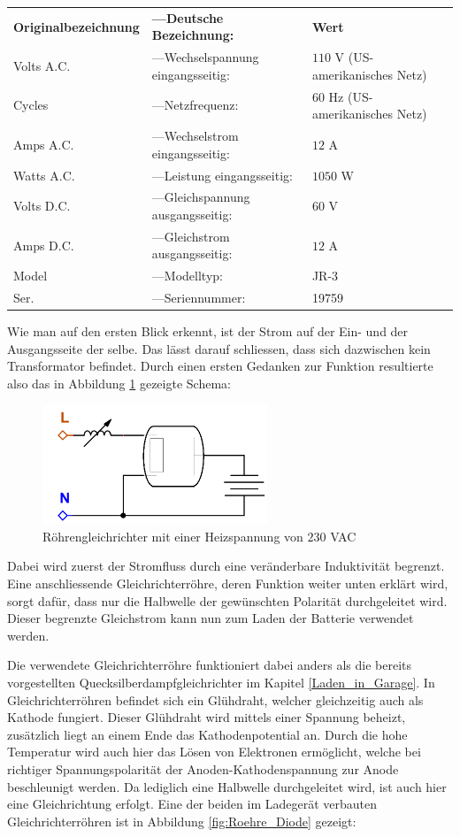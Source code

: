 \begin{tabular}{lll}
	\textbf{Originalbezeichnung} & \textbf{---\quad Deutsche Bezeichnung:} & \textbf{Wert} \\
	Volts A.C. & ---\quad Wechselspannung eingangsseitig: & $110$ V (US-amerikanisches Netz) \\
	Cycles & ---\quad Netzfrequenz: & $60$ Hz (US-amerikanisches Netz)\\
	Amps A.C. & ---\quad Wechselstrom eingangsseitig: & $12$ A \\
	Watts A.C. & ---\quad Leistung eingangsseitig: & $1050$ W \\
	Volts D.C. & ---\quad Gleichspannung ausgangsseitig: & $60$ V \\
	Amps D.C. & ---\quad Gleichstrom ausgangsseitig: & $12$ A \\
	Model & ---\quad Modelltyp: & JR-3 \\
	Ser. & ---\quad Seriennummer: & 19759
\end{tabular}

Wie man auf den ersten Blick erkennt, ist der Strom auf der Ein- und der Ausgangsseite der selbe. Das lässt darauf schliessen, dass sich dazwischen kein Transformator befindet. Durch einen ersten Gedanken zur Funktion resultierte also das in Abbildung \ref{fig:Ladegeraet1} gezeigte Schema:

\begin{figure}[h]
	\centering
		\includegraphics[width=0.60\textwidth]{images/Ladegeraet_Alt_1.PNG}
	\caption{Röhrengleichrichter mit einer Heizspannung von $230$ VAC}
	\label{fig:Ladegeraet1}
\end{figure}

Dabei wird zuerst der Stromfluss durch eine veränderbare Induktivität begrenzt. Eine anschliessende Gleichrichterröhre, deren Funktion weiter unten erklärt wird, sorgt dafür, dass nur die Halbwelle der gewünschten Polarität durchgeleitet wird. Dieser begrenzte Gleichstrom kann nun zum Laden der Batterie verwendet werden.

Die verwendete Gleichrichterröhre funktioniert dabei anders als die bereits vorgestellten Quecksilberdampfgleichrichter im Kapitel \ref{Laden_in_Garage}. In Gleichrichterröhren befindet sich ein Glühdraht, welcher gleichzeitig auch als Kathode fungiert. Dieser Glühdraht wird mittels einer Spannung beheizt, zusätzlich liegt an einem Ende das Kathodenpotential an. Durch die hohe Temperatur wird auch hier das Lösen von Elektronen ermöglicht, welche bei richtiger Spannungspolarität der Anoden-Kathodenspannung zur Anode beschleunigt werden. Da lediglich eine Halbwelle durchgeleitet wird, ist auch hier eine Gleichrichtung erfolgt. Eine der beiden im Ladegerät verbauten Gleichrichterröhren ist in Abbildung \ref{fig:Roehre_Diode} gezeigt: \newpage

